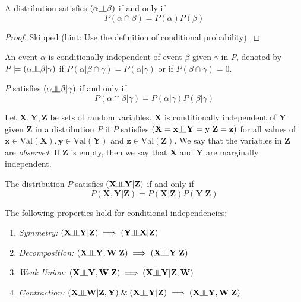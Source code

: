 \begin{prop}
A distribution satisfies $(\alpha \ind \beta)$ if and only if 
\begin{equation}
P(\alpha\cap\beta) = P(\alpha)P(\beta)
\end{equation}
\end{prop}
\begin{proof}
Skipped (hint: Use the definition of conditional probability).
\end{proof}
\begin{defn}
An event $\alpha$ is conditionally independent of event $\beta$ given $\gamma$ in $P$, denoted by $P \models (\alpha \ind\beta|\gamma)$ if $P(\alpha|\beta\cap\gamma) = P(\alpha|\gamma)$ or if $P(\beta\cap\gamma) = 0$.
\end{defn}
\begin{prop}
$P$ satisfies $(\alpha\ind\beta|\gamma)$ if and only if 
\begin{equation}
P(\alpha \cap\beta|\gamma) = P(\alpha|\gamma)P(\beta|\gamma)
\end{equation}
\end{prop}
\begin{defn}
Let $\mathbf{X, Y, Z}$ be sets of random variables. $\mathbf X$ is conditionally independent of $\mathbf Y$ given $\mathbf Z$ in a distribution $P$ if $P$ satisfies $(\mathbf X = \mathbf x \ind \mathbf Y = \mathbf y | \mathbf Z = \mathbf z)$ for all values of $\mathbf x \in \text{Val}(\mathbf X), \mathbf y \in \text{Val}(\mathbf Y)$ and $\mathbf z \in \text{Val}(\mathbf Z)$. We say that the variables in $\mathbf Z$ are \textit{observed}. If $\mathbf Z$ is empty, then we say that $\mathbf X$ and $\mathbf Y$ are marginally independent.
\end{defn}
\begin{prop}
The distribution $P$ satisfies $(\mathbf X \ind \mathbf Y|\mathbf Z)$ if and only if 
\begin{equation}
	P(\mathbf X,\mathbf Y|\mathbf Z) = P(\mathbf X|\mathbf Z)P(\mathbf Y|\mathbf Z)
\end{equation}
\end{prop}
The following properties hold for conditional independencies:
\begin{enumerate}
	\item \textit{Symmetry:} $(\mathbf X \ind \mathbf Y|\mathbf Z) \implies (\mathbf Y \ind \mathbf X|\mathbf Z)$
	\item \textit{Decomposition:} $(\mathbf X \ind \mathbf{Y, W}|\mathbf Z) \implies (\mathbf X \ind \mathbf Y|\mathbf{Z})$
	\item \textit{Weak Union:} $(\mathbf X \ind \mathbf Y, \mathbf W|\mathbf Z) \implies (\mathbf X \ind \mathbf Y|\mathbf Z,  \mathbf W)$
	\item \textit{Contraction:} $(\mathbf X \ind \mathbf W|\mathbf Z, \mathbf Y)\; \& \;(\mathbf X \ind \mathbf Y|\mathbf Z) \implies (\mathbf X \ind \mathbf Y, \mathbf W|\mathbf Z)$
\end{enumerate}
